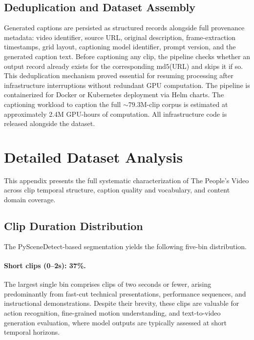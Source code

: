 \documentclass{article}
\begin{document}
\subsection{Deduplication and Dataset Assembly}
\label{app:assembly}

Generated captions are persisted as structured records alongside full provenance metadata: video identifier, source URL, original description, frame-extraction timestamps, grid layout, captioning model identifier, prompt version, and the generated caption text. Before captioning any clip, the pipeline checks whether an output record already exists for the corresponding $\mathrm{md5}$(URL) and skips it if so. This deduplication mechanism proved essential for resuming processing after infrastructure interruptions without redundant GPU computation. The pipeline is containerized for Docker or Kubernetes deployment via Helm charts. The captioning workload to caption the full ${\sim}79.3$M-clip corpus is estimated at approximately 2.4M GPU-hours of computation. All infrastructure code is released alongside the dataset.

\section{Detailed Dataset Analysis}
\label{app:analysis}

This appendix presents the full systematic characterization of The People's Video across clip temporal structure, caption quality and vocabulary, and content domain coverage.

\subsection{Clip Duration Distribution}

The PySceneDetect-based segmentation yields the following five-bin distribution.

\paragraph{Short clips (0--2s): 37\%.}
The largest single bin comprises clips of two seconds or fewer, arising predominantly from fast-cut technical presentations, performance sequences, and instructional demonstrations. Despite their brevity, these clips are valuable for action recognition, fine-grained motion understanding, and text-to-video generation evaluation, where model outputs are typically assessed at short temporal horizons.
\end{document}
